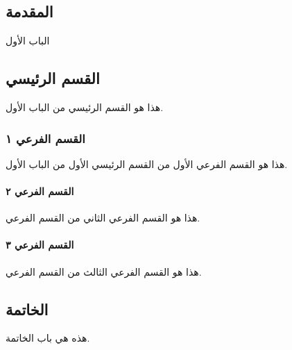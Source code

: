\documentclass[a4paper,12pt]{book}
\begin{document}
\renewcommand{\contentsname}{المحتويات} %
\tableofcontents
	
	\begin{otherlanguage}{arabic}
		\chapter{المقدمة}
	الباب الأول
		
		\section{القسم الرئيسي}
		هذا هو القسم الرئيسي من الباب الأول.
		
		\subsection{القسم الفرعي ١}
		هذا هو القسم الفرعي الأول من القسم الرئيسي الأول من الباب الأول.
		
		\subsubsection{القسم الفرعي ٢}
		هذا هو القسم الفرعي الثاني من القسم الفرعي.
		
		\subsubsection{القسم الفرعي ٣}
		هذا هو القسم الفرعي الثالث من القسم الفرعي.
		
		\section{الخاتمة}
		هذه هي باب الخاتمة.
	\end{otherlanguage}
	
\end{document}
